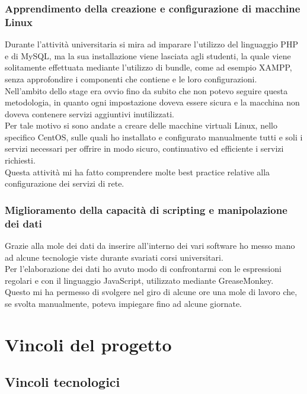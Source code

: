 \documentclass[Tesi.tex]{subfiles}
\begin{document}
\subsubsection{Apprendimento della creazione e configurazione di macchine Linux}
Durante l'attività universitaria si mira ad imparare l'utilizzo del linguaggio PHP e di MySQL, ma la sua installazione viene lasciata agli studenti, la quale viene solitamente effettuata mediante l'utilizzo di bundle, come ad esempio XAMPP, senza approfondire i componenti che contiene e le loro configurazioni. \\
Nell'ambito dello stage era ovvio fino da subito che non potevo seguire questa metodologia, in quanto ogni impostazione doveva essere sicura e la macchina non doveva contenere servizi aggiuntivi inutilizzati. \\
Per tale motivo si sono andate a creare delle macchine virtuali Linux, nello specifico CentOS, sulle quali ho installato e configurato manualmente tutti e soli i servizi necessari per offrire in modo sicuro, continuativo ed efficiente i servizi richiesti. \\
Questa attività mi ha fatto comprendere molte best practice relative alla configurazione dei servizi di rete.

\subsubsection{Miglioramento della capacità di scripting e manipolazione dei dati}
Grazie alla mole dei dati da inserire all'interno dei vari software ho messo mano ad alcune tecnologie viste durante svariati corsi universitari. \\
Per l'elaborazione dei dati ho avuto modo di confrontarmi con le espressioni regolari e con il linguaggio JavaScript, utilizzato mediante GreaseMonkey. \\
Questo mi ha permesso di svolgere nel giro di alcune ore una mole di lavoro che, se svolta manualmente, poteva impiegare fino ad alcune giornate.

\newpage
\section{Vincoli del progetto}
\subsection{Vincoli tecnologici}
\end{document}
